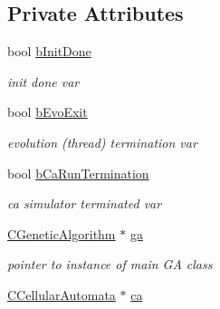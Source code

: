 \subsection*{Private Attributes}
\begin{DoxyCompactItemize}
\item 
\hypertarget{classCThreadCore_a5227042e1033fe13a8008f5e168be186}{
bool \hyperlink{classCThreadCore_a5227042e1033fe13a8008f5e168be186}{bInitDone}}
\label{classCThreadCore_a5227042e1033fe13a8008f5e168be186}

\begin{DoxyCompactList}\small\item\em init done var \item\end{DoxyCompactList}\item 
\hypertarget{classCThreadCore_a600744bc7de7dc91afe82eb8e1f1c339}{
bool \hyperlink{classCThreadCore_a600744bc7de7dc91afe82eb8e1f1c339}{bEvoExit}}
\label{classCThreadCore_a600744bc7de7dc91afe82eb8e1f1c339}

\begin{DoxyCompactList}\small\item\em evolution (thread) termination var \item\end{DoxyCompactList}\item 
\hypertarget{classCThreadCore_a7583f058641e2ddd3f7ff6f74a49a3e5}{
bool \hyperlink{classCThreadCore_a7583f058641e2ddd3f7ff6f74a49a3e5}{bCaRunTermination}}
\label{classCThreadCore_a7583f058641e2ddd3f7ff6f74a49a3e5}

\begin{DoxyCompactList}\small\item\em ca simulator terminated var \item\end{DoxyCompactList}\item 
\hypertarget{classCThreadCore_afba26cc1a0606dbc2a61bc5cc1b606f9}{
\hyperlink{classCGeneticAlgorithm}{CGeneticAlgorithm} $\ast$ \hyperlink{classCThreadCore_afba26cc1a0606dbc2a61bc5cc1b606f9}{ga}}
\label{classCThreadCore_afba26cc1a0606dbc2a61bc5cc1b606f9}

\begin{DoxyCompactList}\small\item\em pointer to instance of main GA class \item\end{DoxyCompactList}\item 
\hypertarget{classCThreadCore_a66fd0ab7d1c294b88d6354073a0aaeb1}{
\hyperlink{classCCellularAutomata}{CCellularAutomata} $\ast$ \hyperlink{classCThreadCore_a66fd0ab7d1c294b88d6354073a0aaeb1}{ca}}
\label{classCThreadCore_a66fd0ab7d1c294b88d6354073a0aaeb1}


\end{DoxyCompactItemize}
